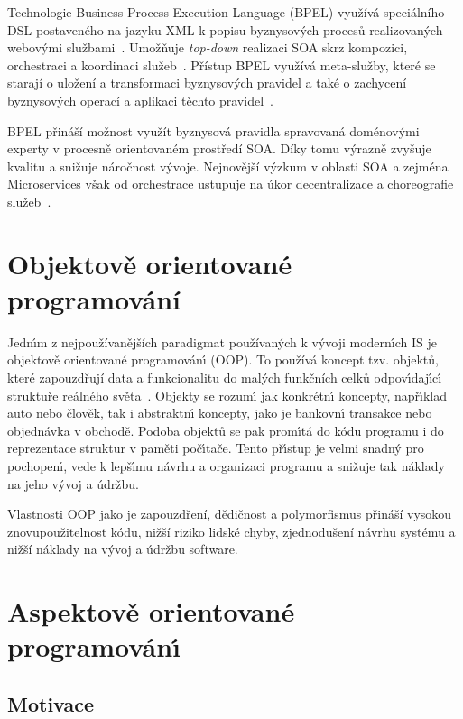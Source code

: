 Technologie Business Process Execution Language (\gls{BPEL}) využívá speciálního \gls{DSL}
postaveného na jazyku \gls{XML} k popisu byznysových procesů realizovaných webovými
službami~\cite{andrews2003business}. Umožňuje \textit{top-down} realizaci \gls{SOA}
skrz kompozici, orchestraci a koordinaci služeb~\cite{oraclebpel}.
Přístup \gls{BPEL} využívá meta-služby, které se starají o uložení a transformaci byznysových pravidel
a také o zachycení byznysových operací a aplikaci těchto pravidel~\cite{rosenberg2005business}.

\gls{BPEL} přináší možnost využít byznysová pravidla spravovaná doménovými experty
v procesně orientovaném prostředí \gls{SOA}. Díky tomu výrazně zvyšuje kvalitu a snižuje
náročnost vývoje. Nejnovější výzkum v oblasti \gls{SOA} a zejména Microservices
však od orchestrace ustupuje na úkor decentralizace a choreografie
služeb~\cite{bakshi2017microservices}\cite{cerny2018contextual}.

\section{Objektově orientované programování}\label{sec:oop}

Jedn\'{\i}m z nejpoužívanějších paradigmat používaných k
v\'yvoji modern\'{\i}ch \gls{IS} je objektově orientované programován\'{\i} (\gls{OOP}).
To používá koncept tzv. objektů, které zapouzdřují data a funkcionalitu do
malých funkčních celků odpov\'{\i}daj\'{\i}c\'{\i} struktuře reálného světa~\cite{rentsch1982object}.
Objekty se rozum\'{\i} jak konkrétn\'{\i} koncepty, např\'{\i}klad auto nebo člověk, tak i
abstraktn\'{\i} koncepty, jako je bankovn\'{\i} transakce nebo objednávka v obchodě.
Podoba objektů se pak prom\'{\i}tá do kódu programu i do reprezentace struktur v paměti
poč\'{\i}tače. Tento př\'{\i}stup je velmi snadn\'y pro pochopen\'{\i},
vede k lepš\'{\i}mu návrhu a organizaci programu a snižuje
tak náklady na jeho v\'yvoj a údržbu.

Vlastnosti \gls{OOP} jako je zapouzdření, dědičnost a polymorfismus přináší
vysokou znovupoužitelnost kódu, nižší riziko lidské chyby, zjednodušení
návrhu systému a nižší náklady na vývoj a údržbu software.

\section{Aspektově orientované programován\'{\i}}\label{sec:aop}

\subsection{Motivace}


